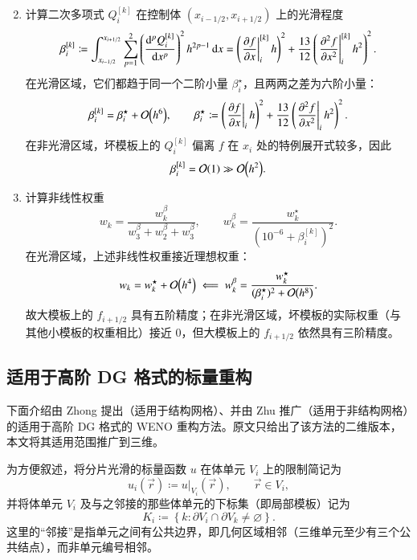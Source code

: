 \begin{enumerate}[wide]
\begin{equation}
\end{equation}
\item 计算二次多项式 $Q_{i}^{[k]}$ 在控制体 $(x_{i-1/2},x_{i+1/2})$ 上的光滑程度
\begin{equation}
\beta_{i}^{[k]}\coloneqq\int_{x_{i-1/2}}^{x_{i+1/2}}\sum_{p=1}^{2}\left(\dv[p]{Q_{i}^{[k]}}{x}\right)^{2}h^{2p-1}\dd{x}=\left(\eval{\pdv{f}{x}}_{i}^{[k]}h\right)^{2}+\frac{13}{12}\left(\eval{\pdv[2]{f}{x}}_{i}^{[k]}h^{2}\right)^{2}.
\end{equation}
在光滑区域，它们都趋于同一个二阶小量 $\beta_{i}^{\star}$，且两两之差为六阶小量：
\begin{equation}
\beta_{i}^{[k]}=\beta_{i}^{\star}+\order{h^{6}},\qquad\beta_{i}^{\star}\coloneqq\left(\eval{\pdv{f}{x}}_{i}h\right)^{2}+\frac{13}{12}\left(\eval{\pdv[2]{f}{x}}_{i}h^{2}\right)^{2}.
\end{equation}
在非光滑区域，坏模板上的 $Q_{i}^{[k]}$ 偏离 $f$ 在 $x_{i}$ 处的特例展开式较多，因此
\begin{equation}
\beta_{i}^{[k]}=\order{1}\gg\order{h^{2}}.
\end{equation}
\item 计算非线性权重
\begin{equation}
w_{k}=\frac{w_{k}^{\beta}}{w_{3}^{\beta}+w_{2}^{\beta}+w_{3}^{\beta}},\qquad w_{k}^{\beta}=\frac{w_{k}^{\star}}{\left(10^{-6}+\beta_{i}^{[k]}\right)^{2}}.
\end{equation}
在光滑区域，上述非线性权重接近理想权重：
\begin{equation}
w_{k}=w_{k}^{\star}+\order{h^{4}}\impliedby w_{k}^{\beta}=\frac{w_{k}^{\star}}{(\beta_{i}^{\star})^{2}+\order{h^{8}}}.
\end{equation}
故大模板上的 $f_{i+1/2}$ 具有五阶精度；在非光滑区域，坏模板的实际权重（与其他小模板的权重相比）接近 $0$，但大模板上的
$f_{i+1/2}$ 依然具有三阶精度。
\end{enumerate}
%

\subsection{适用于高阶 DG 格式的标量重构}

下面介绍由 Zhong 提出（适用于结构网格）、并由 Zhu
推广（适用于非结构网格）的适用于高阶 DG 格式的 WENO 重构方法。原文只给出了该方法的二维版本，本文将其适用范围推广到三维。

为方便叙述，将分片光滑的标量函数 $u$ 在体单元 $V_{i}$ 上的限制简记为
\begin{equation}
u_{i}(\vec{r})\coloneqq u\vert_{V_{i}}(\vec{r}),\qquad\vec{r}\in V_{i},
\end{equation}
并将体单元 $V_{i}$ 及与之邻接的那些体单元的下标集（即局部模板）记为
\begin{equation}
K_{i}\coloneqq\left\{ k:\partial V_{i}\cap\partial V_{k}\ne\varnothing\right\} .
\end{equation}
这里的“邻接”是指单元之间有公共边界，即几何区域相邻（三维单元至少有三个公共结点），而非单元编号相邻。


